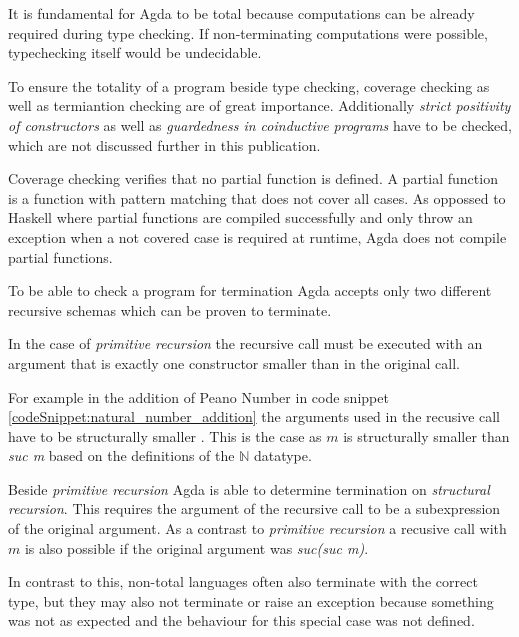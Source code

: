 It is fundamental for Agda to be total because computations can be already required during type checking.
If non-terminating computations were possible, typechecking itself would be undecidable\cite{agda_wiki_totality}.

To ensure the totality of a program beside type checking, coverage checking as well as termiantion checking are of great importance. 
Additionally \emph{strict positivity of constructors} as well as \emph{guardedness in coinductive programs} have to be checked, which are not discussed further in this publication.

Coverage checking verifies that no partial function is defined. A partial function is a function with pattern matching that does not cover all cases.
As oppossed to Haskell where partial functions are compiled successfully and only throw an exception when a not covered case is required at runtime, Agda does not compile partial functions.

To be able to check a program for termination Agda accepts only two different recursive schemas which can be proven to terminate.

In the case of \emph{primitive recursion} the recursive call must be executed with an argument that is exactly one constructor smaller than in the original call.

For example in the addition of Peano Number in code snippet \ref{codeSnippet:natural_number_addition} the arguments used in the recusive call have to be structurally smaller \cite{norell:deptyped}. 
This is the case as $m$ is structurally smaller than \emph{suc m} based on the definitions of the $\mathbb{N}$ datatype.

Beside \emph{primitive recursion} Agda is able to determine termination on \emph{structural recursion}.
This requires the argument of the recursive call to be a subexpression of the original argument.
As a contrast to \emph{primitive recursion} a recusive call with $m$ is also possible if the original argument was \emph{suc(suc m)}.

In contrast to this, non-total languages often also terminate with the correct type, but they may also not terminate or raise an exception because something was not as expected and the behaviour for this special case was not defined.
